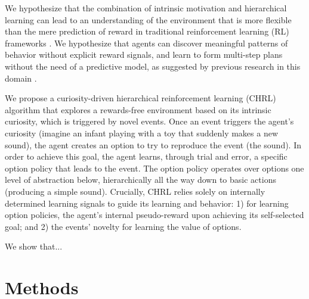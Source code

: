 \documentclass{article}
\begin{document}
We hypothesize that the combination of intrinsic motivation and hierarchical learning can lead to an understanding of the environment that is more flexible than the mere prediction of reward in traditional reinforcement learning (RL) frameworks \cite{sutton_reinforcement_2017}. We hypothesize that agents can discover meaningful patterns of behavior without explicit reward signals, and learn to form multi-step plans without the need of a predictive model, as suggested by previous research in this domain \cite{machado_learning_2016, chentanez_intrinsically_2005, pathak_curiosity-driven_2017, kulkarni_hierarchical_2016, botvinick_model-based_2014}.%

We propose a curiosity-driven hierarchical reinforcement learning (CHRL) algorithm that explores a rewards-free environment based on its intrinsic curiosity, which is triggered by novel events. Once an event triggers the agent's curiosity (imagine an infant playing with a toy that suddenly makes a new sound), the agent creates an option \cite{sutton_between_1999} to try to reproduce the event (the sound). In order to achieve this goal, the agent learns, through trial and error, a specific option policy that leads to the event.%
The option policy operates over options one level of abstraction below, hierarchically all the way down to basic actions (producing a simple sound).
Crucially, CHRL relies solely on internally determined learning signals to guide its learning and behavior: 1) for learning option policies, the agent's internal pseudo-reward upon achieving its self-selected goal; and 2) the events' novelty for learning the value of options.

We show that...


\section{Methods}
 
\end{document}

